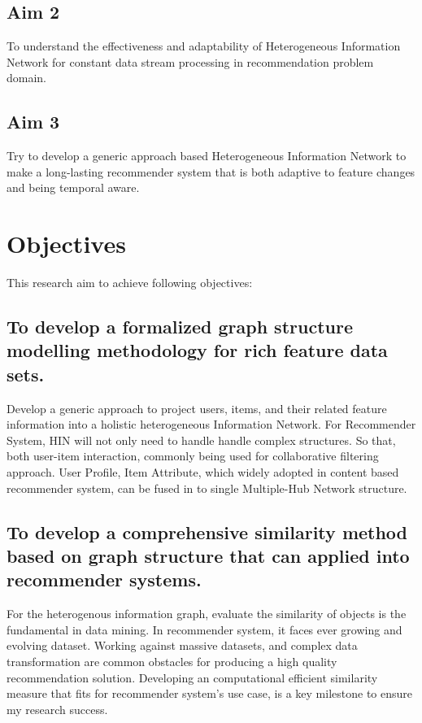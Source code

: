 \subsection{Aim 2}
To understand the effectiveness and adaptability of Heterogeneous Information Network for constant data stream processing in recommendation problem domain. 

\subsection{Aim 3}
Try to develop a generic approach based Heterogeneous Information Network to make a long-lasting recommender system that is both adaptive to feature changes and being temporal aware. 

\section{Objectives}
This research aim to achieve following objectives: 

\subsection{To develop a formalized graph structure modelling methodology for rich feature data sets.  }

Develop a generic approach to project users, items, and their related feature information into a holistic heterogeneous Information Network. For Recommender System, HIN will not only need to handle handle complex structures. So that, both user-item interaction, commonly being used for collaborative filtering approach. User Profile, Item Attribute, which widely adopted in content based recommender system, can be fused in to single Multiple-Hub Network \citep{Shi2017} structure.

\subsection{To develop a comprehensive similarity method based on graph structure that can applied into recommender systems. } 

For the heterogenous information graph, evaluate the similarity of objects is the fundamental in data mining. In recommender system, it faces ever growing and evolving dataset. Working against massive datasets, and complex data transformation are common obstacles for producing a high quality recommendation solution. Developing an computational efficient similarity measure that fits for recommender system's use case, is a key milestone to ensure my research success.


